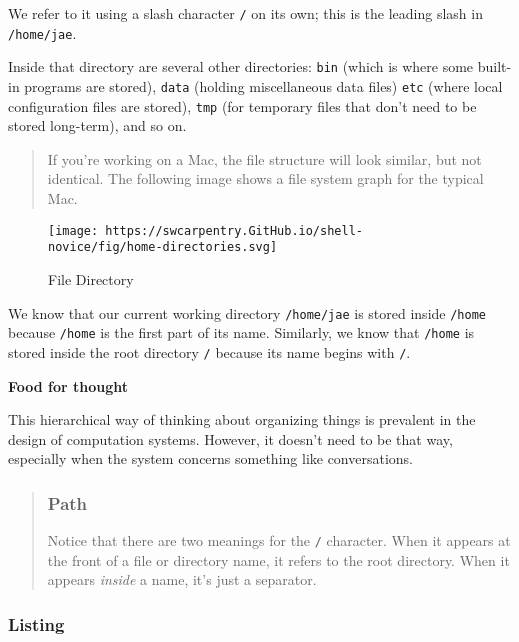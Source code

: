\documentclass[
]{book}
\begin{document}
We refer to it using a slash character \texttt{/} on its own; this is the leading slash in \texttt{/home/jae}.

Inside that directory are several other directories: \texttt{bin} (which is where some built-in programs are stored), \texttt{data} (holding miscellaneous data files) \texttt{etc} (where local configuration files are stored), \texttt{tmp} (for temporary files that don't need to be stored long-term), and so on.

\begin{quote}
If you're working on a Mac, the file structure will look similar, but not identical. The following image shows a file system graph for the typical Mac.
\end{quote}

\begin{figure}
\centering
\texttt{[image: https://swcarpentry.GitHub.io/shell-novice/fig/home-directories.svg]}
\caption{File Directory}
\end{figure}

We know that our current working directory \texttt{/home/jae} is stored inside \texttt{/home} because \texttt{/home} is the first part of its name. Similarly, we know that \texttt{/home} is stored inside the root directory \texttt{/} because its name begins with \texttt{/}.

\textbf{Food for thought}

This hierarchical way of thinking about organizing things is prevalent in the design of computation systems. However, it doesn't need to be that way, especially when the system concerns something like conversations.

\begin{quote}
\hypertarget{path}{%
\subsubsection{Path}\label{path}}

Notice that there are two meanings for the \texttt{/} character.
When it appears at the front of a file or directory name, it refers to the root directory. When it appears \emph{inside} a name, it's just a separator.
\end{quote}

\hypertarget{listing}{%
\subsubsection{Listing}\label{listing}}
\end{document}
